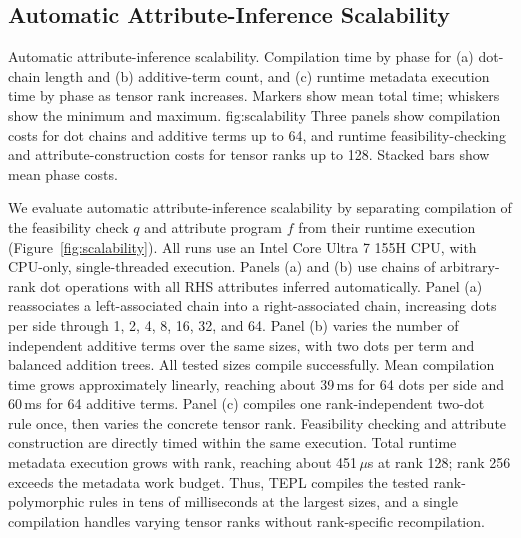 \FloatBarrier
\subsection{Automatic Attribute-Inference Scalability}
\label{app:evaluation-scalability}
{Automatic attribute-inference scalability. Compilation time by phase for
(a) dot-chain length and (b) additive-term count, and (c) runtime metadata
execution time by phase as tensor rank increases. Markers show mean total
time; whiskers show the minimum and maximum.}
{fig:scalability}
{Three panels show compilation costs for dot chains and additive terms up
to 64, and runtime feasibility-checking and attribute-construction costs
for tensor ranks up to 128. Stacked bars show mean phase costs.}

We evaluate automatic attribute-inference scalability by separating
compilation of the feasibility check $q$ and attribute program $f$ from
their runtime execution (Figure~\ref{fig:scalability}). All runs use an
Intel Core Ultra 7 155H CPU, with CPU-only, single-threaded execution.
Panels (a) and (b) use chains of arbitrary-rank dot operations with all RHS
attributes inferred automatically. Panel (a) reassociates a left-associated
chain into a right-associated chain, increasing dots per side through
1, 2, 4, 8, 16, 32, and 64. Panel (b) varies the number of independent
additive terms over the same sizes, with two dots per term and balanced
addition trees. All tested sizes compile successfully. Mean compilation
time grows approximately linearly, reaching about 39\,ms for 64 dots per
side and 60\,ms for 64 additive terms. Panel (c) compiles one rank-independent
two-dot rule once, then varies the concrete tensor rank. Feasibility
checking and attribute construction are directly timed within the same
execution. Total runtime metadata execution grows with rank, reaching
about 451\,$\mu$s at rank 128; rank 256 exceeds the metadata work budget.
Thus, TEPL compiles the tested rank-polymorphic rules in tens of
milliseconds at the largest sizes, and a single compilation handles
varying tensor ranks without rank-specific recompilation.
